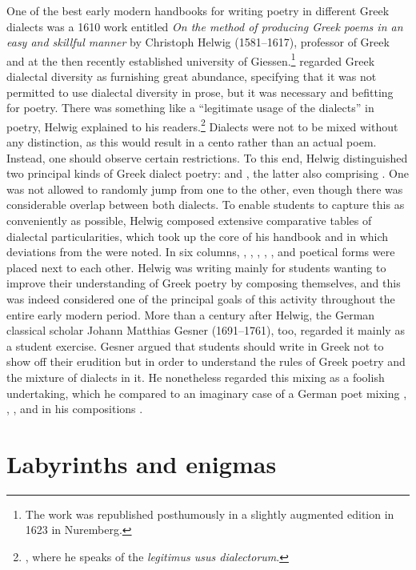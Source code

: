 One of the best early modern handbooks for writing poetry in different Greek dialects was a 1610 work entitled \textit{On the method of producing Greek poems in an easy and skillful manner} by Christoph Helwig (1581–1617), professor of Greek and  at the then recently established university of Giessen.\footnote{The work was republished posthumously in a slightly augmented edition in 1623 in Nuremberg.} \citet[19]{Helwig1610} regarded Greek dialectal diversity as furnishing great abundance, specifying that it was not permitted to use dialectal diversity in prose, but it was necessary and befitting for poetry. There was something like a “legitimate usage of the dialects” in poetry, Helwig explained to his readers.\footnote{\citet[21–24]{Helwig1610}, where he speaks of the \textit{legitimus usus dialectorum}.} Dialects were not to be mixed without any distinction, as this would result in a cento rather than an actual poem. Instead, one should observe certain restrictions. To this end, Helwig distinguished two principal kinds of Greek dialect poetry:  and , the latter also comprising . One was not allowed to randomly jump from one to the other, even though there was considerable overlap between both dialects. To enable students to capture this as conveniently as possible, Helwig composed extensive comparative tables of dialectal particularities, which took up the core of his handbook and in which deviations from the  were noted. In six columns, , , , , , and poetical forms were placed next to each other. Helwig was writing mainly for students wanting to improve their understanding of Greek poetry by composing themselves, and this was indeed considered one of the principal goals of this activity throughout the entire early modern period. More than a century after Helwig, the German classical scholar Johann Matthias Gesner (1691–1761), too, regarded it mainly as a student exercise. Gesner argued that students should write in Greek not to show off their erudition but in order to understand the rules of Greek poetry and the mixture of dialects in it. He nonetheless regarded this mixing as a foolish undertaking, which he compared to an imaginary case of a German poet mixing , , , and  in his compositions \citep[162]{Gesner1774}.

\section{Labyrinths and enigmas}\label{sec:3.3}

